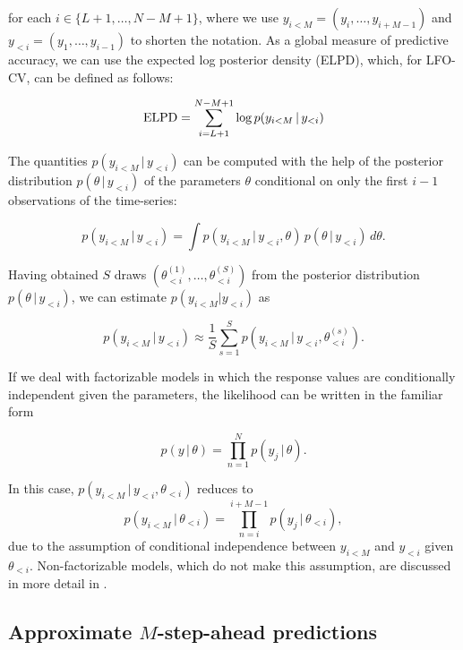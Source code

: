 \documentclass[american,]{article}
\begin{document}
for each \(i \in \{L + 1, \ldots, N - M + 1\}\), where we use
\(y_{i<M} = (y_i, \ldots, y_{i + M - 1})\) and \(y_{<i} = (y_{1}, \ldots, y_{i-1})\)
to shorten the notation. As a global measure of predictive accuracy, we
can use the expected log posterior density (ELPD), which, for LFO-CV, can
be defined as follows:

\begin{equation}
{\rm ELPD} = \sum_{i=L+1}^{N - M + 1} \log p(y_{i<M} \,|\, y_{<i})
\end{equation}

The quantities \(p(y_{i<M} \,|\, y_{<i})\) can be computed with the help of the
posterior distribution \(p(\theta \,|\, y_{<i})\) of the parameters \(\theta\)
conditional on only the first \(i-1\) observations of the time-series:

\begin{equation}
p(y_{i<M} \,| \, y_{<i}) = 
  \int p(y_{i<M} \,| \, y_{<i}, \theta) \, p(\theta\,|\,y_{<i}) \,d\theta. 
\end{equation}

Having obtained \(S\) draws \((\theta_{<i}^{(1)}, \ldots, \theta_{<i}^{(S)})\)
from the posterior distribution \(p(\theta\,|\,y_{<i})\), we can estimate
\(p(y_{i<M} | y_{<i})\) as

\begin{equation}
p(y_{i<M} \,|\, y_{<i}) \approx \frac{1}{S}
\sum_{s=1}^S p(y_{i<M} \,|\, y_{<i}, \theta_{<i}^{(s)}).
\end{equation}

If we deal with factorizable models in which the response values are
conditionally independent given the parameters, the likelihood can be written in
the familiar form

\begin{equation}
p(y \,|\, \theta) = \prod_{n=1}^N p(y_j \,|\, \theta).
\end{equation}

In this case, \(p(y_{i<M} \,|\, y_{<i}, \theta_{<i})\) reduces to
\begin{equation}
p(y_{i<M} \,|\, \theta_{<i}) = \prod_{n = i}^{i + M -1} p(y_j \,|\, \theta_{<i}),
\end{equation}
due to the assumption of conditional independence between \(y_{i<M}\) and \(y_{<i}\)
given \(\theta_{<i}\). Non-factorizable models, which do not make this assumption,
are discussed in more detail in \citet{buerkner:non-factorizable}.

\hypertarget{approximate_MSAP}{%
\subsection{\texorpdfstring{Approximate \(M\)-step-ahead predictions}{Approximate M-step-ahead predictions}}\label{approximate_MSAP}}
\end{document}
